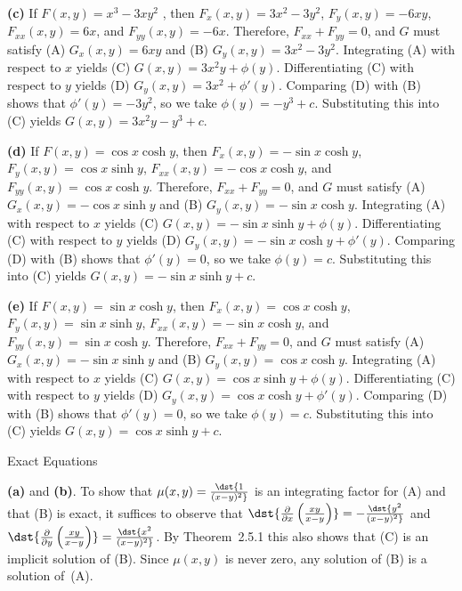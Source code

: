 \documentclass[dvips]{book}
\renewcommand{\exer}[1]{\par\medskip\;\noindent{\color{red}\bf #1.}}
\numberwithin{example}{section}
\numberwithin{equation}{section}
\numberwithin{theorem}{section}
\numberwithin{table}{section}
\numberwithin{figure}{section}
\begin{document}
{\bf (c)}
If $F(x,y)=x^3-3xy^2$ , then $F_x(x,y)=3x^2-3y^2$, $F_y(x,y)=-6xy$,
$F_{xx}(x,y)=6x$, and $F_{yy}(x,y)=-6x$.
Therefore, $F_{xx}+F_{yy}=0$, and $G$ must satisfy
(A) $G_x(x,y)=6xy$ and (B) $G_y(x,y)=3x^2-3y^2$.
Integrating (A) with respect to $x$ yields
(C) $G(x,y)=3x^2y+\phi(y)$.
Differentiating (C) with respect to $y$  yields
(D) $G_y(x,y)=3x^2+\phi'(y)$.
Comparing (D) with (B)  shows that
$\phi'(y)=-3y^2$, so we take
$\phi(y)=-y^3+c$.
Substituting this into (C) yields
$G(x,y)=3x^2y-y^3+c$.

{\bf (d)}
If $F(x,y)=\cos x\cosh y$, then $F_x(x,y)=-\sin x\cosh y$,
$F_y(x,y)=\cos x\sinh y$,
$F_{xx}(x,y)=-\cos x\cosh y$, and $F_{yy}(x,y)=\cos x\cosh y$.
Therefore, $F_{xx}+F_{yy}=0$, and $G$ must satisfy
(A) $G_x(x,y)=-\cos x\sinh y$ and (B) $G_y(x,y)=-\sin x\cosh y$.
Integrating (A) with respect to $x$ yields
(C) $G(x,y)=-\sin x\sinh y+\phi(y)$.
Differentiating (C) with respect to $y$  yields
(D) $G_y(x,y)=-\sin x\cosh y+\phi'(y)$.
Comparing (D) with (B)  shows that
$\phi'(y)=0$, so we take
$\phi(y)=c$.
Substituting this into (C) yields
$G(x,y)=-\sin x\sinh y+c$.

{\bf (e)}
If $F(x,y)=\sin x\cosh y$, then $F_x(x,y)=\cos x\cosh y$,
 $F_y(x,y)=\sin x\sinh y$,
$F_{xx}(x,y)=-\sin x\cosh y$, and $F_{yy}(x,y)=\sin x\cosh y$.
Therefore, $F_{xx}+F_{yy}=0$, and $G$ must satisfy
(A) $G_x(x,y)=-\sin x\sinh y$ and (B) $G_y(x,y)=\cos x\cosh y$.
Integrating (A) with respect to $x$ yields
(C) $G(x,y)=\cos x\sinh y+\phi(y)$.
Differentiating (C) with respect to $y$  yields
(D) $G_y(x,y)=\cos x\cosh y+\phi'(y)$.
Comparing (D) with (B)  shows that
$\phi'(y)=0$, so we take
$\phi(y)=c$.
Substituting this into (C) yields
$G(x,y)=\cos x\sinh y+c$.

{Exact Equations}
\renewcommand{\thissection}{}
\thissection

      \vspace*{-17.5pt}

\exer{2.6.2}
{\bf (a)} and {\bf (b)}. To show that $\mu(x,y)=\dst{1\over(x-y)^2}$
is an integrating
factor for (A) and that (B) is exact, it suffices to observe that
$\dst{{\partial \over\partial x}\left(xy\over x-y\right)}=-
\dst{y^2\over(x-y)^2}$ and
$\dst{{\partial \over\partial y}\left(xy\over x-y\right)}=
\dst{x^2\over(x-y)^2}$. By Theorem~2.5.1 this also shows that
(C) is an implicit solution of (B). Since
$\mu(x,y)$ is never zero, any solution of (B)  is a solution of~(A).
\end{document}
